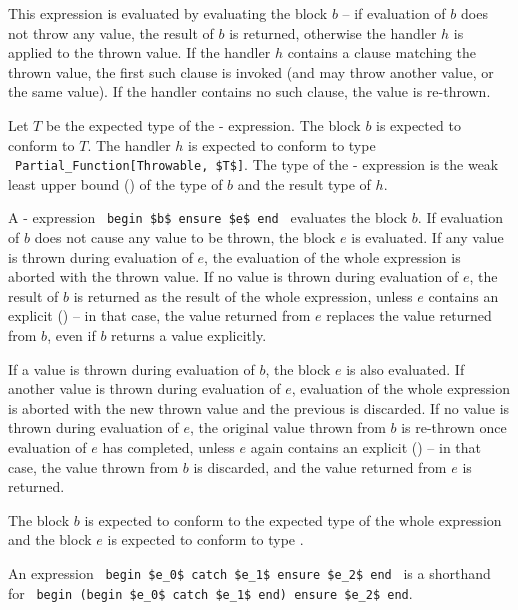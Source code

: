 This expression is evaluated by evaluating the block $b$ -- if evaluation of $b$ does not throw any value, the result of $b$ is returned, otherwise the handler $h$ is applied to the thrown value. If the handler $h$ contains a  clause matching the thrown value, the first such clause is invoked (and may throw another value, or the same value). If the handler contains no such clause, the value is re-thrown. 

Let $T$ be the expected type of the - expression. The block $b$ is expected to conform to $T$. The handler $h$ is expected to conform to type ~\lstinline!Partial_Function[Throwable, $T$]!. The type of the - expression is the weak least upper bound () of the type of $b$ and the result type of $h$. 

A - expression ~\lstinline!begin $b$ ensure $e$ end!~ evaluates the block $b$. If evaluation of $b$ does not cause any value to be thrown, the block $e$ is evaluated. If any value is thrown during evaluation of $e$, the evaluation of the whole expression is aborted with the thrown value. If no value is thrown during evaluation of $e$, the result of $b$ is returned as the result of the whole expression, unless $e$ contains an explicit  () -- in that case, the value returned from $e$ replaces the value returned from $b$, even if $b$ returns a value explicitly. 

If a value is thrown during evaluation of $b$, the  block $e$ is also evaluated. If another value is thrown during evaluation of $e$, evaluation of the whole expression is aborted with the new thrown value and the previous is discarded. If no value is thrown during evaluation of $e$, the original value thrown from $b$ is re-thrown once evaluation of $e$ has completed, unless $e$ again contains an explicit  () -- in that case, the value thrown from $b$ is discarded, and the value returned from $e$ is returned. 

The block $b$ is expected to conform to the expected type of the whole expression and the  block $e$ is expected to conform to type . 

An expression ~\lstinline!begin $e_0$ catch $e_1$ ensure $e_2$ end!~ is a shorthand for ~\lstinline!begin (begin $e_0$ catch $e_1$ end) ensure $e_2$ end!. 






